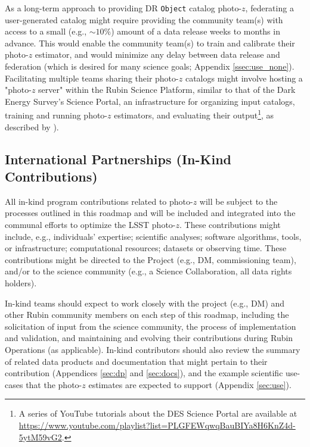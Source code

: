 \documentclass[DM,lsstdraft,toc]{lsstdoc}
\begin{document}
As a long-term approach to providing DR {\tt Object} catalog photo-$z$, federating a user-generated catalog might require providing the community team(s) with access to a small (e.g., $\sim10\%$) amount of a data release weeks to months in advance.
This would enable the community team(s) to train and calibrate their photo-$z$ estimator, and would minimize any delay between data release and federation (which is desired for many science goals; Appendix \ref{ssec:use_none}).
Facilitating multiple teams sharing their photo-$z$ catalogs might involve hosting a "photo-$z$ server" within the Rubin Science Platform, similar to that of the Dark Energy Survey's Science Portal, an infrastructure for organizing input catalogs, training and running photo-$z$ estimators, and evaluating their output\footnote{A series of YouTube tutorials about the DES Science Portal are available at \url{https://www.youtube.com/playlist?list=PLGFEWqwqBauBIYa8H6KnZ4d-5ytM59vG2}.}, as described by \citet{2018A&C....25...58G}).

\subsection{International Partnerships (In-Kind Contributions)}\label{ssec:time_inkind}

All in-kind program contributions related to photo-$z$ will be subject to the processes outlined in this roadmap and will be included and integrated into the communal efforts to optimize the LSST photo-$z$.
These contributions might include, e.g., individuals' expertise; scientific analyses; software algorithms, tools, or infrastructure; computational resources; datasets or observing time.
These contributions might be directed to the Project (e.g., DM, commissioning team), and/or to the science community (e.g., a Science Collaboration, all data rights holders). 

In-kind teams should expect to work closely with the project (e.g., DM) and other Rubin community members on each step of this roadmap, including the solicitation of input from the science community, the process of implementation and validation, and maintaining and evolving their contributions during Rubin Operations (as applicable).
In-kind contributors should also review the summary of related data products and documentation that might pertain to their contribution (Appendices \ref{sec:dp} and  \ref{sec:docs}), and the example scientific use-cases that the photo-$z$ estimates are expected to support (Appendix \ref{sec:use}).
\end{document}
